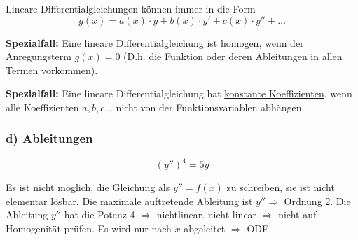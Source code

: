 Lineare Differentialgleichungen können immer in die Form 
\begin{equation*}
    g(x) = a(x)\cdot y + b(x) \cdot y' + c(x)\cdot y'' + \ldots
\end{equation*}

\textbf{Spezialfall:} Eine lineare Differentialgleichung ist
\underline{homogen}, wenn der Anregungsterm $g(x)=0$ 
(D.h. die Funktion oder deren Ableitungen in allen Termen vorkommen).

\textbf{Spezialfall:} Eine lineare Differentialgleichung hat \underline{%
konstante Koeffizienten}, wenn alle Koeffizienten $a,b,c\ldots$ nicht von der
Funktionsvariablen abhängen.

\subsubsection*{d) Ableitungen}

\begin{equation*}
    \left( y'' \right)^{4} = 5y%
\end{equation*}

\begin{outline}
    \1 Es ist nicht möglich, die Gleichung als $y''=f(x)$ zu schreiben, sie
    ist nicht elementar lösbar.
    \1 Die maximale auftretende Ableitung ist $y''\Rightarrow$ Ordnung 2.
    \1 Die Ableitung $y''$ hat die Potenz 4 $\Rightarrow$ nichtlinear.
    \1 nicht-linear $\Rightarrow$ nicht auf Homogenität prüfen.
    \1 Es wird nur nach $x$ abgeleitet $\Rightarrow$ ODE.
\end{outline}

